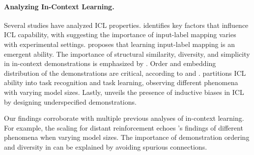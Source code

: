 \documentclass{article} %
\begin{document}



\paragraph{Analyzing In-Context Learning.}
Several studies have analyzed ICL properties. \cite{min2022rethinking} identifies key factors that influence ICL capability, with \cite{yoo2022groundtruth} suggesting the importance of input-label mapping varies with experimental settings. \cite{wei2023larger} proposes that learning input-label mapping is an emergent ability. The importance of structural similarity, diversity, and simplicity in in-context demonstrations is emphasized by \cite{an2023incontext}. Order and embedding distribution of the demonstrations are critical, according to \cite{lu-etal-2022-fantastically} and \cite{liu-etal-2022-makes}. \cite{pan2023incontext} partitions ICL ability into task recognition and task learning, observing different phenomena with varying model sizes. Lastly, \cite{si2023measuring} unveils the presence of inductive biases in ICL by designing underspecified demonstrations.

Our findings corroborate with multiple previous analyses of in-context learning. 
For example, the scaling for distant reinforcement echoes \cite{wei2023larger,pan2023incontext}'s findings of different phenomena when varying model sizes. 
The importance of demonstration ordering and diversity in \cite{an2023incontext,lu-etal-2022-fantastically} can be explained by avoiding spurious connections. 
\end{document}
